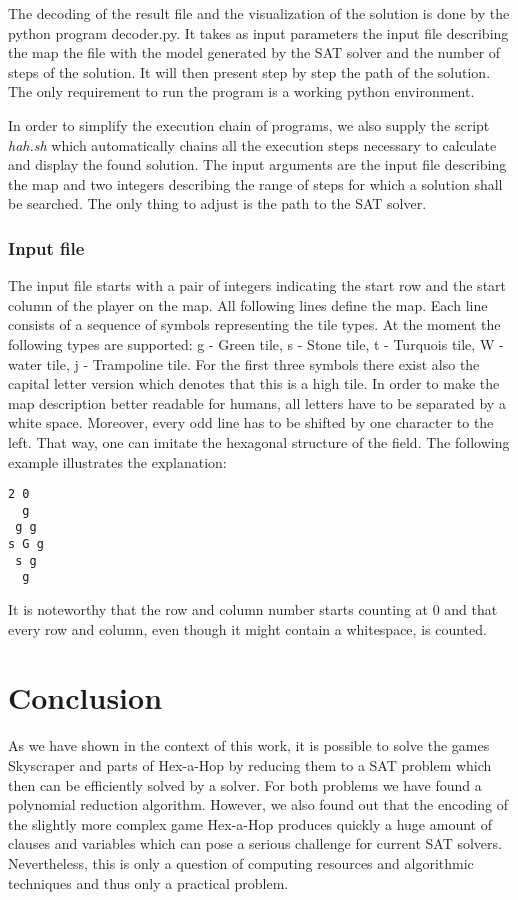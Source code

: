 \documentclass[a4paper, 12pt, titlepage]{article}
\begin{document}
The decoding of the result file and the visualization of the solution is done by the python program decoder.py. 
It takes as input parameters the input file describing the map the file with the model generated by the SAT solver and the number of steps of the solution. 
It will then present step by step the path of the solution. 
The only requirement to run the program is a working python environment. 

In order to simplify the execution chain of programs, we also supply the script \emph{hah.sh} which automatically chains all the execution steps necessary to calculate and display the found solution. The input arguments are the input file describing the map and two integers describing the range of steps for which a solution shall be searched. The only thing to adjust is the path to the SAT solver.

\subsubsection{Input file}

The input file starts with a pair of integers indicating the start row and the start column of the player on the map. 
All following lines define the map. 
Each line consists of a sequence of symbols representing the tile types. 
At the moment the following types are supported: \pmb g - Green tile, \pmb s - Stone tile, \pmb t - Turquois tile, \pmb W - water tile, \pmb j - Trampoline tile. 
For the first three symbols there exist also the capital letter version which denotes that this is a high tile. 
In order to make the map description better readable for humans, all letters have to be separated by a white space. 
Moreover, every odd line has to be shifted by one character to the left. 
That way, one can imitate the hexagonal structure of the field. 
The following example illustrates the explanation:
\begin{verbatim}
2 0
  g
 g g
s G g
 s g
  g	
\end{verbatim}
It is noteworthy that the row and column number starts counting at 0 and that every row and column, even though it might contain a whitespace, is counted.


\section{Conclusion}

As we have shown in the context of this work, it is possible to solve the games Skyscraper and parts of Hex-a-Hop by reducing them to a SAT problem which then can be efficiently solved by a solver. 
For both problems we have found a polynomial reduction algorithm.
However, we also found out that the encoding of the slightly more complex game Hex-a-Hop produces quickly a huge amount of clauses and variables which can pose a serious challenge for current SAT solvers.
Nevertheless, this is only a question of computing resources and algorithmic techniques and thus only a practical problem.
\end{document}
